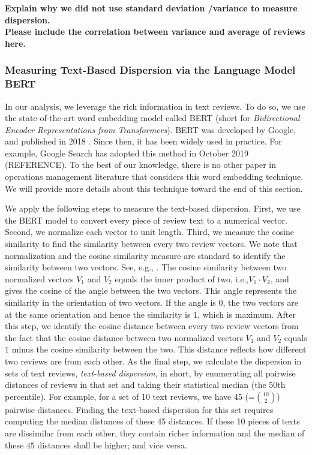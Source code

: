 \documentclass[msom,blindrev]{informs3}
\begin{document}
\textbf{Explain why we did not use standard deviation /variance to measure dispersion.}\\

\textbf{Please include the correlation between variance and average of reviews here.}\\

\subsubsection{Measuring Text-Based Dispersion via the Language Model BERT} \label{Subsec: Define Txt Ent}

In our analysis, we leverage the rich information in text reviews. To do so, we use the state-of-the-art word embedding model called BERT (short for \textit{Bidirectional Encoder Representations from Transformers}). BERT was developed by Google, and published in 2018 \citep{devlin2018bert}. Since then, it has been widely used in practice. For example, Google Search has adopted this method in October 2019 (REFERENCE). To the best of our knowledge, there is no other paper in operations management literature that considers this word embedding technique. We will provide more details about this technique toward the end of this section.

We apply the following steps to measure the text-based dispersion. First, we use the BERT model to convert every piece of review text to a numerical vector. Second, we normalize each vector to unit length. Third, we measure the cosine similarity to find the similarity between every two review vectors. We note that normalization and the cosine similarity measure are standard to identify the similarity between two vectors. See, e.g., \cite{hoberg2016text}. The cosine similarity between two normalized vectors $V_{1}$ and $V_{2}$ equals the inner product of two, i.e.,$V_1 \cdot V_2$, and gives the cosine of the angle between the two vectors. This angle represents the similarity in the orientation of two vectors. If the angle is $0$, the two vectors are at the same orientation and hence the similarity is $1$, which is maximum. After this step, we identify the cosine distance between every two review vectors from the fact that the cosine distance between two normalized vectors $V_{1}$ and $V_{2}$ equals $1$ minus the cosine similarity between the two. This distance reflects how different two reviews are from each other. As the final step, we calculate the dispersion in sets of text reviews, \emph{text-based dispersion}, in short, by enumerating all pairwise distances of reviews in that set and taking their statistical median (the 50th percentile). For example, for a set of 10 text reviews, we have 45 (=$\binom{10}{2}$) pairwise distances. Finding the text-based dispersion for this set requires computing the median distances of these 45 distances. If these 10 pieces of texts are dissimilar from each other, they contain richer information and the median of these $45$ distances shall be higher; and vice versa.
\end{document}
